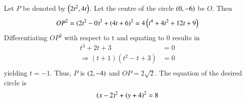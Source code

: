 Let $P$ be denoted by $\left(2t^2,4t\right)$.  Let the centre of the circle $\left(0,-6\right)$ be $O$. Then
%
\begin{equation}
OP^2 = (2t^2-0)^2+(4t+6)^2 = 4\left(t^4+4t^2+12t+9\right)
\end{equation}
%
Differentiating $OP^2$ with respect to t and equating to 0 results in
\begin{align}
t^3+2t+3&=0\\
\Rightarrow (t+1)(t^2-t+3)&=0\\
\end{align}
yielding  $t=-1$.  Thus, $P$ is $\left(2,-4\right)$ and $OP = 2\sqrt{2}$.  The equation of the desired circle is
%
\begin{equation}
\left(x-2\right)^2 + \left(y+4\right)^2 = 8
\end{equation}
%
